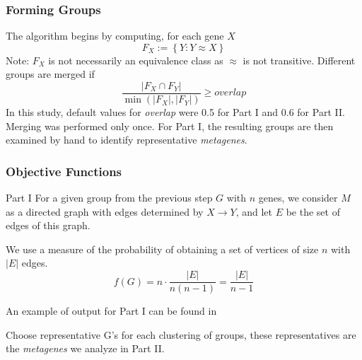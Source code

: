 \documentclass[
	11pt, %
]{beamer}
\begin{document}
\begin{frame}
	\frametitle{Forming Groups}

    The algorithm begins by computing, for each gene $X$
    \begin{equation*}
        F_X := \left\{ Y : Y \approx X \right\}
    \end{equation*}
    \pause
    Note: $F_X$ is not necessarily an equivalence class as $\approx$ is not transitive. Different groups are merged if
    \begin{equation*}
        \frac{\left| F_X \cap F_Y \right|}{\min(\left| F_X \right|, \left| F_Y \right|)} \geq overlap
    \end{equation*}
    \pause
    In this study, default values for \emph{overlap} were 0.5 for Part I and 0.6 for Part II. Merging was performed only once. For Part I, the resulting groups are then examined by hand to identify representative \emph{metagenes}.
\end{frame}

\begin{frame}
    \frametitle{Objective Functions}
    \begin{block}{Part I}
        For a given group from the previous step $G$ with $n$ genes, we consider $M$ as a directed graph with edges determined by $X \rightarrow Y$, and let $E$ be the set of edges of this graph.
        \smallskip
        
        \pause
        We use a measure of the probability of obtaining a set of vertices of size $n$ with $\left| E \right|$ edges.
        \begin{equation*}
            f(G) = n \cdot \frac{\left| E \right|}{n(n-1)}= \frac{\left| E \right|}{n-1}
        \end{equation*}
    \end{block}

    \pause
    \bigskip
    An example of output for Part I can be found in \cite[page 12]{p2}

    \pause
    \bigskip
    Choose representative G's for each clustering of groups, these representatives are the \emph{metagenes} we analyze in Part II.
\end{frame}
\end{document}
